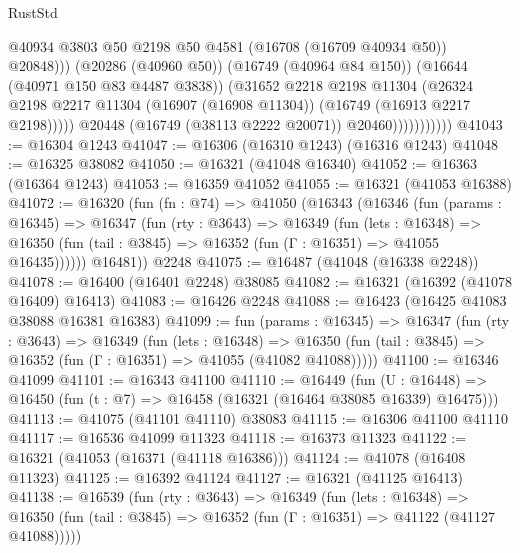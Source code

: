 \begin{lexlean}{RustStd}
\begin{coremodule}
                                  @40934
                                  @3803
                                  @50
                                  @2198
                                  @50
                                  @4581
                                  (@16708 (@16709 @40934 @50))
                                  @20848)))
                            (@20286 (@40960 @50))
                            (@16749 (@40964 @84 @150))
                            (@16644 (@40971 @150 @83 @4487 @3838))
                            (@31652
                              @2218
                              @2198
                              @11304
                              (@26324
                                @2198
                                @2217
                                @11304
                                (@16907 (@16908 @11304))
                                (@16749 (@16913 @2217 @2198)))))
                          @20448
                          (@16749 (@38113 @2222 @20071))
                          @20460)))))))))))
@41043 := @16304 @1243
@41047 := @16306 (@16310 @1243) (@16316 @1243)
@41048 := @16325 @38082
@41050 := @16321 (@41048 @16340)
@41052 := @16363 (@16364 @1243)
@41053 := @16359 @41052
@41055 := @16321 (@41053 @16388)
@41072 := @16320
    (fun (fn : @74) =>
    @41050
      (@16343
        (@16346
          (fun (params : @16345) =>
          @16347
            (fun (rty : @3643) =>
            @16349
              (fun (lets : @16348) =>
              @16350 (fun (tail : @3845) => @16352 (fun (Γ : @16351) => @41055 @16435))))))
        @16481))
    @2248
@41075 := @16487 (@41048 (@16338 @2248))
@41078 := @16400 (@16401 @2248) @38085
@41082 := @16321 (@16392 (@41078 @16409) @16413)
@41083 := @16426 @2248
@41088 := @16423 (@16425 @41083 @38088 @16381 @16383)
@41099 := fun (params : @16345) =>
  @16347
    (fun (rty : @3643) =>
    @16349
      (fun (lets : @16348) =>
      @16350 (fun (tail : @3845) => @16352 (fun (Γ : @16351) => @41055 (@41082 @41088)))))
@41100 := @16346 @41099
@41101 := @16343 @41100
@41110 := @16449
    (fun (U : @16448) => @16450 (fun (t : @7) => @16458 (@16321 (@16464 @38085 @16339) @16475)))
@41113 := @41075 (@41101 @41110) @38083
@41115 := @16306 @41100 @41110
@41117 := @16536 @41099 @11323
@41118 := @16373 @11323
@41122 := @16321 (@41053 (@16371 (@41118 @16386)))
@41124 := @41078 (@16408 @11323)
@41125 := @16392 @41124
@41127 := @16321 (@41125 @16413)
@41138 := @16539
    (fun (rty : @3643) =>
    @16349
      (fun (lets : @16348) =>
      @16350 (fun (tail : @3845) => @16352 (fun (Γ : @16351) => @41122 (@41127 @41088)))))

\end{coremodule}
\end{lexlean}
